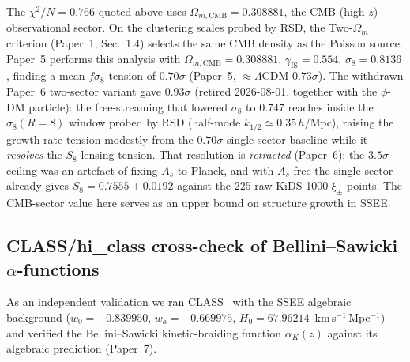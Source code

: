 \documentclass[12pt,a4paper]{article}
\begin{document}
\begin{tcolorbox}[colback=yellow!5!white,colframe=orange!80!black,title={Sector caveat for $f\sigma_8$}]
The $\chi^2/N=0.766$ quoted above uses $\Omega_{m,\mathrm{CMB}}=0.308881$, the CMB
(high-$z$) observational sector. On the clustering scales probed by RSD, the
Two-$\Omega_m$ criterion (Paper~1, Sec.~1.4) selects the same CMB density as
the Poisson source. Paper~5
performs this analysis with $\Omega_{m,\mathrm{CMB}}=0.308881$, $\gamma_\mathrm{IS}=0.554$,
$\sigma_8=0.8136$, finding a mean $f\sigma_8$ tension of $0.70\sigma$ (Paper~5,
$\approx\Lambda$CDM $0.73\sigma$).
The withdrawn Paper~6 two-sector variant gave $0.93\sigma$ (retired 2026-08-01,
together with the $\phi$-DM particle): the free-streaming that lowered $\sigma_8$
to $0.747$ reaches inside the $\sigma_8(R{=}8)$ window probed by RSD (half-mode
$k_{1/2}\simeq0.35\,h/$Mpc), raising the growth-rate tension modestly from the
$0.70\sigma$ single-sector baseline while it \emph{resolves} the
$S_8$ lensing tension. That resolution is \emph{retracted} (Paper~6): the
$3.5\sigma$ ceiling was an artefact of fixing $A_s$ to Planck, and with $A_s$
free the single sector already gives $S_8=0.7555\pm0.0192$ against the 225 raw
KiDS-1000 $\xi_\pm$ points.
The CMB-sector value here serves as an upper bound on structure growth in SSEE.
\end{tcolorbox}

\subsection{CLASS/hi\_class cross-check of Bellini--Sawicki $\alpha$-functions}
\label{sec:hiclass}

As an independent validation we ran CLASS~\citep{Lesgourgues2011} with the
SSEE algebraic background ($w_0=-0.839950$, $w_a=-0.669975$,
$H_0=67.96214$~km\,s$^{-1}$\,Mpc$^{-1}$) and verified the
Bellini--Sawicki kinetic-braiding function $\alpha_K(z)$
\citep{Bellini2015} against its algebraic prediction (Paper~7).
\end{document}
